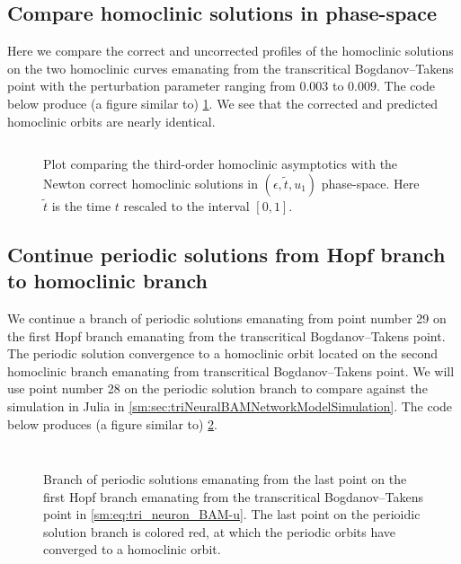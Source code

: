 \subsection{Compare homoclinic solutions in phase-space}
Here we compare the correct and uncorrected profiles of the homoclinic
solutions on the two homoclinic curves emanating from the transcritical
Bogdanov--Takens point with the perturbation parameter ranging from $0.003$ to
$0.009$.
The code below produce (a figure similar to)
\cref{sm:fig:triNeuronBAMNeuralNetworkModelCompareOrbitsPhaseSpace}. We see
that the corrected and predicted homoclinic orbits are nearly identical.
\inputminted[firstline=356, lastline=385]{MATLAB}{\pathToDDEBifToolDemos/BAM_neural_network_model/BAMnn.m}
%
\begin{figure}[ht]
    \caption{Plot comparing the third-order homoclinic asymptotics with the
        Newton correct homoclinic solutions in $(\epsilon,\tilde t, u_1)$
        phase-space. Here $\tilde t$ is the time $t$ rescaled to the interval
        $[0,1]$.
    }
    \label{sm:fig:triNeuronBAMNeuralNetworkModelCompareOrbitsPhaseSpace}
\end{figure}

\subsection{Continue periodic solutions from Hopf branch to homoclinic branch}
We continue a branch of periodic solutions emanating from point number 29 on the
first Hopf branch emanating from the transcritical Bogdanov--Takens point. The
periodic solution convergence to a homoclinic orbit located on the second
homoclinic branch emanating from transcritical Bogdanov--Takens point. We will
use point number 28 on the periodic solution branch to compare against the
simulation in Julia in \cref{sm:sec:triNeuralBAMNetworkModelSimulation}. The
code below produces (a figure similar to)
\cref{sm:fig:triNeuronBAMNeuralNetworkModelPeriodicSolutions}.
\inputminted[firstline=387, lastline=391]{MATLAB}{\pathToDDEBifToolDemos/BAM_neural_network_model/BAMnn.m}
\vspace*{-12pt}
\inputminted[firstline=398, lastline=414]{MATLAB}{\pathToDDEBifToolDemos/BAM_neural_network_model/BAMnn.m}
\begin{figure}[ht]
    \caption{
        Branch of periodic solutions emanating from the last point on the first
        Hopf branch emanating from the transcritical Bogdanov--Takens point in
        \cref{sm:eq:tri_neuron_BAM-u}. The last point on the perioidic solution
        branch is colored red, at which the periodic orbits have converged to
        a homoclinic orbit.
    }
    \label{sm:fig:triNeuronBAMNeuralNetworkModelPeriodicSolutions}
\end{figure}

